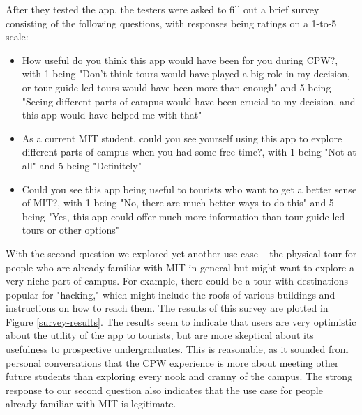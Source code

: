 \documentclass{sigchi}
\begin{document}
After they tested the app, the testers were asked to fill out a brief survey consisting of the following questions, with responses being ratings on a 1-to-5 scale:
\begin{itemize}
\item How useful do you think this app would have been for you during CPW?, with 1 being "Don't think tours would have played a big role in my decision, or tour guide-led tours would have been more than enough" and 5 being "Seeing different parts of campus would have been crucial to my decision, and this app would have helped me with that"
\item As a current MIT student, could you see yourself using this app to explore different parts of campus when you had some free time?, with 1 being "Not at all" and 5 being "Definitely"
\item Could you see this app being useful to tourists who want to get a better sense of MIT?, with 1 being "No, there are much better ways to do this" and 5 being "Yes, this app could offer much more information than tour guide-led tours or other options"
\end{itemize}
With the second question we explored yet another use case -- the physical tour for people who are already familiar with MIT in general but might want to explore a very niche part of campus. For example, there could be a tour with destinations popular for "hacking," which might include the roofs of various buildings and instructions on how to reach them. The results of this survey are plotted in Figure \ref{survey-results}. The results seem to indicate that users are very optimistic about the utility of the app to tourists, but are more skeptical about its usefulness to prospective undergraduates. This is reasonable, as it sounded from personal conversations that the CPW experience is more about meeting other future students than exploring every nook and cranny of the campus. The strong response to our second question also indicates that the use case for people already familiar with MIT is legitimate.
\end{document}

